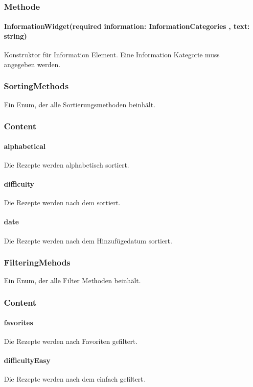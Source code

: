 \documentclass[parskip=full]{scrartcl}
\begin{document}
\subsubsection*{Methode}
\paragraph*{InformationWidget(required information: InformationCategories , text: string)} Konstruktor für Information Element. Eine Information Kategorie muss angegeben werden.


\subsubsection{SortingMethods}
Ein Enum, der alle Sortierungsmethoden beinhält.
\subsubsection*{Content}
\paragraph*{alphabetical} Die Rezepte werden alphabetisch sortiert.
\paragraph*{difficulty} Die Rezepte werden nach dem  sortiert.
\paragraph*{date} Die Rezepte werden nach dem Hinzufügedatum sortiert.

\subsubsection{FilteringMehods}
Ein Enum, der alle Filter Methoden beinhält.
\subsubsection*{Content}
\paragraph*{favorites} Die Rezepte werden nach Favoriten gefiltert.
\paragraph*{difficultyEasy} Die Rezepte werden nach dem  einfach gefiltert.
\end{document}
